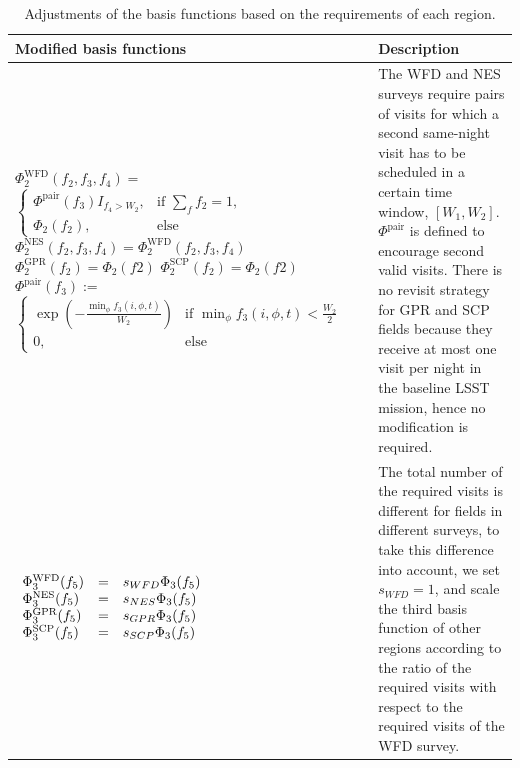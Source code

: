 \documentclass[11pt]{article}
\theoremstyle{definition}
\begin{document}
\begin{table}[h!]\label{tab_regionBF}
\caption{Adjustments of the basis functions based on the requirements of each region.}
\begin{tabularx}{\textwidth}{| X | X |}
\hline
Modified basis functions & Description\\ \hline \hline
$\Phi_2^{\text{WFD}}(f_2,f_3,f_4) =$ \newline $\begin{cases} \Phi^{\text{pair}}(f_3)I_{f_4> W_2},& \text{if } \sum\limits_{f}{f_2} = 1,\\ \Phi_2(f_2),& \text{else } \end{cases}$ \newline\newline $\Phi_2^{\text{NES}}(f_2,f_3,f_4) =\Phi_2^{\text{WFD}}(f_2,f_3,f_4)$ \newline\newline $\Phi_2^{\text{GPR}}(f_2) = \Phi_2(f2)$ \newline\newline $\Phi_2^{\text{SCP}}(f_2) = \Phi_2(f2)$\newline\newline $\Phi^{\text{pair}}(f_3) :=$ \newline $\begin{cases} \exp(- \frac{\min_{\phi}f_3(i,\phi,t)}{W_2})& \text{if } \min_{\phi}f_3(i,\phi,t) < \frac{W_2}{2}\\ 0, & \text{else}\end{cases}$ 
& The WFD and NES surveys require pairs of visits for which a second same-night visit has to be scheduled in a certain time window, $[W_1,W_2]$. $ \Phi^{\text{pair}}$ is defined to encourage second valid visits. There is no revisit strategy for GPR and SCP fields because they receive at most one visit per night in the baseline LSST mission, hence no modification is required.\\ \hline
$\begin{array}{l c l}\Phi_3^{\text{WFD}}(f_5) &=& s_{WFD} \Phi_3(f_5)\\ \Phi_3^{\text{NES}}(f_5) &=& s_{NES} \Phi_3(f_5)\\ \Phi_3^{\text{GPR}}(f_5) &=& s_{GPR} \Phi_3(f_5)\\\Phi_3^{\text{SCP}}(f_5) &=& s_{SCP} \Phi_3(f_5)\end{array}$ 
& The total number of the required visits is different for fields in different surveys, to take this difference into account, we set $s_{WFD} = 1$, and scale the third basis function of other regions according to the ratio of the required visits with respect to the required visits of the WFD survey.\\ \hline
\end{tabularx}
\end{table}
\end{document}
